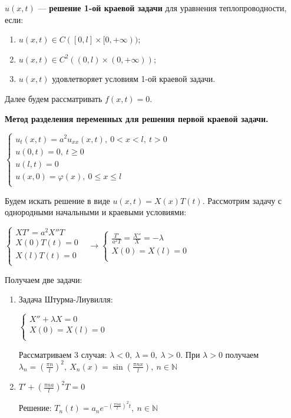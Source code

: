 $u(x,t)$ --- \textbf{решение 1-ой краевой задачи} для уравнения теплопроводности, если:
\begin{enumerate}
    \item $u(x,t)\in C([0,l]\times[0,+\infty))$;
    \item $u(x,t)\in C^2((0,l)\times(0,+\infty))$;
    \item $u(x,t)$ удовлетворяет условиям 1-ой краевой задачи.
\end{enumerate}

\bigbreak
Далее будем рассматривать $f(x,t)=0$.

\bigbreak
\textbf{Метод разделения переменных для решения первой краевой задачи.}

$\begin{cases}
    u_t(x,t)=a^2u_{xx}(x,t),~0<x<l,~t>0&\\
    u(0,t)=0,~t\geqslant0&\\
    u(l,t)=0&\\
    u(x,0)=\varphi(x),~0\leqslant x\leqslant l&\\
\end{cases}$

\bigbreak
Будем искать решение в виде $u(x,t)=X(x)T(t)$. Рассмотрим задачу с однородными начальными и краевыми условиями:

$\begin{cases}
XT'=a^2X''T&\\
X(0)T(t)=0&\\
X(l)T(t)=0&\\
\end{cases} \rightarrow 
\begin{cases}
\frac{T'}{a^2T}=\frac{X''}{X}=-\lambda&\\
X(0)=X(l)=0&\\
\end{cases}$

\bigbreak
Получаем две задачи:
\begin{enumerate}
    \item Задача Штурма-Лиувилля:
    
    $\begin{cases}
    X''+\lambda X=0&\\
    X(0)=X(l)=0&\\
    \end{cases}$
    
    Рассматриваем 3 случая: $\lambda<0,~\lambda=0,~\lambda>0$. При $\lambda>0$ получаем $\lambda_n=(\frac{\pi n}{l})^2,~X_n(x)=\sin(\frac{\pi n x}{l}),~n\in\mathbb{N}$
    
    \item $T'+(\frac{\pi n a}{l})^2 T = 0$
    
    Решение: $T_n(t)=a_n e^{-(\frac{\pi n a}{l})^2t},~n\in\mathbb{N}$
\end{enumerate}

